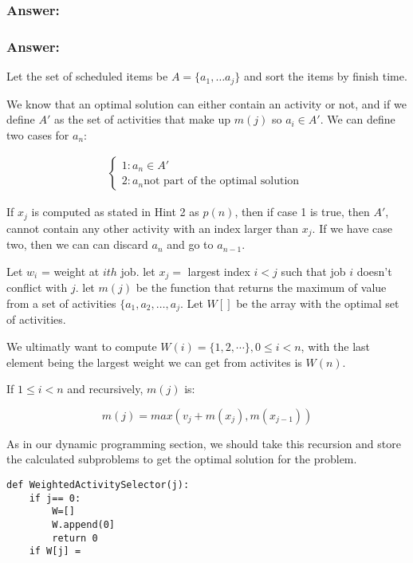 \documentclass[titlepage]{article}\usepackage[]{graphicx}\usepackage[]{color}
\begin{document}
\subsubsection{Answer: }
\subsubsection{Answer: }

Let the set of scheduled items be $A = \{ a_1, \dots a_j\}$ and sort the
items by finish time. 

We know that an optimal solution can either contain an activity or not, and if
we define $A'$ as the set of activities that make up $m(j)$ so 
$a_i \in A'$. We can define two cases for $a_n$:

  \begin{align*}
	  \begin{cases}
		  1: a_n \in A' \\
		  2: a_n \text{not part of the optimal solution } 
	  \end{cases}
  \end{align*}


  If $x_j$ is computed as stated in Hint 2 as $p(n)$, then if case 1 is true, then $A'$,
  cannot contain any other activity with an index larger than $x_j$. If we have
  case two, then we can can discard $a_n$ and go to $a_{n-1}$. 

Let $w_i$ = weight at $ith$ job. 
let $x_j = $ largest index $i < j $ such that job $i$ doesn't conflict with
$j$. 
let $m(j)$ be the function that returns the maximum of value from a set of
activities
$\{a_1, a_2, \dots, a_j$. 
	Let $W[]$ be the array with the optimal set of activities. 

  We ultimatly want to compute $W(i) = \{ 1,2,\dotsi\}, 0
  \leq i < n$, with the last element being the largest weight we can get from
  activites is $W(n)$. 
  
  If $1\leq i < n$ and 
  recursively, $m(j)$  is:


  \[ m(j) = max \left( v_j + m(x_j), m(x_{j-1}) \right) \]

As in our dynamic programming section, we should take this recursion and store
the calculated subproblems to get the optimal solution for the problem. 

\begin{lstlisting}
def WeightedActivitySelector(j):
	if j== 0:
		W=[]
		W.append(0]
		return 0
	if W[j] = 


\end{lstlisting}
\end{document}
